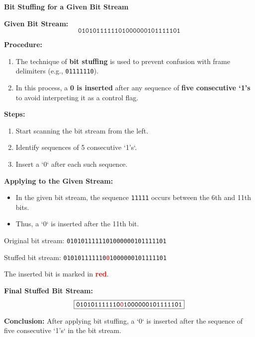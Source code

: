 \documentclass[a4paper,12pt]{article}
\begin{document}
\begin{center}
    \LARGE \textbf{Bit Stuffing for a Given Bit Stream}
\end{center}

\noindent\textbf{Given Bit Stream:}
\[
\texttt{0101011111101000000101111101}
\]

\noindent\textbf{Procedure:}
\begin{enumerate}
    \item The technique of \textbf{bit stuffing} is used to prevent confusion with frame delimiters (e.g., \texttt{01111110}).
    \item In this process, a \textbf{0 is inserted} after any sequence of \textbf{five consecutive `1's} to avoid interpreting it as a control flag.
\end{enumerate}

\noindent\textbf{Steps:}
\begin{enumerate}
    \item Start scanning the bit stream from the left.
    \item Identify sequences of 5 consecutive `1's`.
    \item Insert a `0` after each such sequence.
\end{enumerate}

\noindent\textbf{Applying to the Given Stream:}

\begin{itemize}
    \item In the given bit stream, the sequence \texttt{11111} occurs between the 6th and 11th bits.
    \item Thus, a `0` is inserted after the 11th bit.
\end{itemize}

\begin{tcolorbox}[colback=blue!5, colframe=black, title=\textbf{Bit Stuffing Example}]
Original bit stream: \texttt{0101011111101000000101111101}

Stuffed bit stream: \texttt{010101111110\textcolor{red}{0}1000000101111101}
\end{tcolorbox}

\noindent The inserted bit is marked in \textcolor{red}{\textbf{red}}.

\noindent\textbf{Final Stuffed Bit Stream:}
\[
\boxed{\texttt{010101111110\textcolor{red}{0}1000000101111101}}
\]

\noindent \textbf{Conclusion:} After applying bit stuffing, a `0` is inserted after the sequence of five consecutive `1's` in the bit stream.
\end{document}
